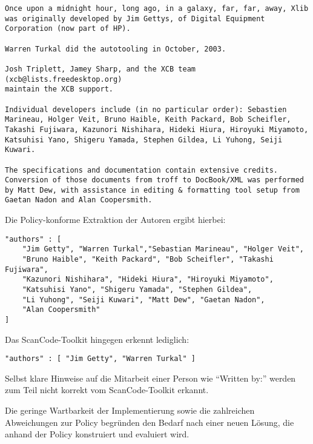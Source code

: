 \begin{lstlisting}[keepspaces=true]
Once upon a midnight hour, long ago, in a galaxy, far, far, away, Xlib
was originally developed by Jim Gettys, of Digital Equipment
Corporation (now part of HP).

Warren Turkal did the autotooling in October, 2003.

Josh Triplett, Jamey Sharp, and the XCB team (xcb@lists.freedesktop.org)
maintain the XCB support.

Individual developers include (in no particular order): Sebastien
Marineau, Holger Veit, Bruno Haible, Keith Packard, Bob Scheifler,
Takashi Fujiwara, Kazunori Nishihara, Hideki Hiura, Hiroyuki Miyamoto,
Katsuhisi Yano, Shigeru Yamada, Stephen Gildea, Li Yuhong, Seiji Kuwari.

The specifications and documentation contain extensive credits.
Conversion of those documents from troff to DocBook/XML was performed
by Matt Dew, with assistance in editing & formatting tool setup from
Gaetan Nadon and Alan Coopersmith.
\end{lstlisting}

Die Policy-konforme Extraktion der Autoren ergibt hierbei:

\begin{lstlisting}[keepspaces=true]
"authors" : [
    "Jim Getty", "Warren Turkal","Sebastian Marineau", "Holger Veit",
    "Bruno Haible", "Keith Packard", "Bob Scheifler", "Takashi Fujiwara",
    "Kazunori Nishihara", "Hideki Hiura", "Hiroyuki Miyamoto",
    "Katsuhisi Yano", "Shigeru Yamada", "Stephen Gildea",
    "Li Yuhong", "Seiji Kuwari", "Matt Dew", "Gaetan Nadon",
    "Alan Coopersmith"
]
\end{lstlisting}

Das ScanCode-Toolkit hingegen erkennt lediglich:

\begin{lstlisting}[keepspaces=true]
"authors" : [ "Jim Getty", "Warren Turkal" ]
\end{lstlisting}

Selbst klare Hinweise auf die Mitarbeit einer Person wie \enquote{Written by:} werden zum Teil nicht korrekt vom ScanCode-Toolkit erkannt.

Die geringe Wartbarkeit der Implementierung sowie die zahlreichen Abweichungen zur Policy begründen den Bedarf nach einer neuen Lösung, die anhand der Policy konstruiert und evaluiert wird.


